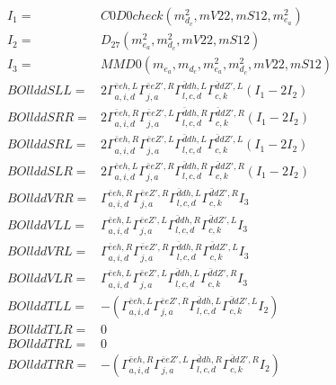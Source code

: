 \documentclass[A4,landscape]{article}
\begin{document}
\begin{align} 
I_1 = & C0D0check(m^2_{d_{{c}}}, mV22, mS12, m^2_{e_{{a}}}) \\ 
I_2 = & D_{27}(m^2_{e_{{a}}}, m^2_{d_{{c}}}, mV22, mS12) \\ 
I_3 = & MMD0(m_{e_{{a}}}, m_{d_{{c}}}, m^2_{e_{{a}}}, m^2_{d_{{c}}}, mV22, mS12) \\ 
  BOllddSLL= & 2  \Gamma^{\bar{e}e h ,L}_{a, i, d} \Gamma^{\bar{e}e {Z'} ,R}_{j, a} \Gamma^{\bar{d}d h ,L}_{l, c, d} \Gamma^{\bar{d}d {Z'} ,L}_{c, k} (I_1 - 2 I_2) \\ 
  BOllddSRR= & 2  \Gamma^{\bar{e}e h ,R}_{a, i, d} \Gamma^{\bar{e}e {Z'} ,L}_{j, a} \Gamma^{\bar{d}d h ,R}_{l, c, d} \Gamma^{\bar{d}d {Z'} ,R}_{c, k} (I_1 - 2 I_2) \\ 
  BOllddSRL= & 2  \Gamma^{\bar{e}e h ,R}_{a, i, d} \Gamma^{\bar{e}e {Z'} ,L}_{j, a} \Gamma^{\bar{d}d h ,L}_{l, c, d} \Gamma^{\bar{d}d {Z'} ,L}_{c, k} (I_1 - 2 I_2) \\ 
  BOllddSLR= & 2  \Gamma^{\bar{e}e h ,L}_{a, i, d} \Gamma^{\bar{e}e {Z'} ,R}_{j, a} \Gamma^{\bar{d}d h ,R}_{l, c, d} \Gamma^{\bar{d}d {Z'} ,R}_{c, k} (I_1 - 2 I_2) \\ 
  BOllddVRR= &  \Gamma^{\bar{e}e h ,R}_{a, i, d} \Gamma^{\bar{e}e {Z'} ,R}_{j, a} \Gamma^{\bar{d}d h ,L}_{l, c, d} \Gamma^{\bar{d}d {Z'} ,R}_{c, k} I_3 \\ 
  BOllddVLL= &  \Gamma^{\bar{e}e h ,L}_{a, i, d} \Gamma^{\bar{e}e {Z'} ,L}_{j, a} \Gamma^{\bar{d}d h ,R}_{l, c, d} \Gamma^{\bar{d}d {Z'} ,L}_{c, k} I_3 \\ 
  BOllddVRL= &  \Gamma^{\bar{e}e h ,R}_{a, i, d} \Gamma^{\bar{e}e {Z'} ,R}_{j, a} \Gamma^{\bar{d}d h ,R}_{l, c, d} \Gamma^{\bar{d}d {Z'} ,L}_{c, k} I_3 \\ 
  BOllddVLR= &  \Gamma^{\bar{e}e h ,L}_{a, i, d} \Gamma^{\bar{e}e {Z'} ,L}_{j, a} \Gamma^{\bar{d}d h ,L}_{l, c, d} \Gamma^{\bar{d}d {Z'} ,R}_{c, k} I_3 \\ 
  BOllddTLL= & -( \Gamma^{\bar{e}e h ,L}_{a, i, d} \Gamma^{\bar{e}e {Z'} ,R}_{j, a} \Gamma^{\bar{d}d h ,L}_{l, c, d} \Gamma^{\bar{d}d {Z'} ,L}_{c, k} I_2) \\ 
  BOllddTLR= & 0 \\ 
  BOllddTRL= & 0 \\ 
  BOllddTRR= & -( \Gamma^{\bar{e}e h ,R}_{a, i, d} \Gamma^{\bar{e}e {Z'} ,L}_{j, a} \Gamma^{\bar{d}d h ,R}_{l, c, d} \Gamma^{\bar{d}d {Z'} ,R}_{c, k} I_2) \\ 
\end{align} 
\end{document}
